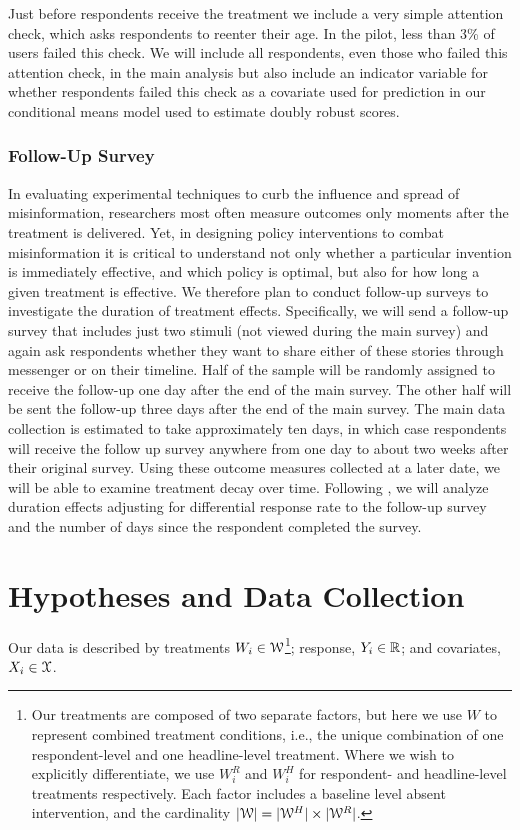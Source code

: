 \documentclass[letterpaper, 12pt, parskip=full,DIV=10]{scrartcl}
\begin{document}
{Just before respondents receive the treatment we include a very simple attention check, which asks respondents to reenter their age. In the pilot, less than 3\% of users failed this check. We will include all respondents, even those who failed this attention check, in the main analysis but also include an indicator variable for whether respondents failed this check as a covariate used for prediction in our conditional means model used to estimate doubly robust scores.} %

\subsubsection{Follow-Up Survey}

In evaluating experimental techniques to curb the influence and spread of misinformation, researchers most often measure outcomes only moments after the treatment is delivered. Yet, in designing policy interventions to combat misinformation it is critical to understand not only whether a particular invention is immediately effective, and which policy is optimal, but also for how long a given treatment is effective. We therefore plan to conduct follow-up surveys to investigate the duration of treatment effects. Specifically, we will send a follow-up survey that includes just two stimuli (not viewed during the main survey) and again ask respondents whether they want to share either of these stories through messenger or on their timeline. Half of the sample will be randomly assigned to receive the follow-up one day after the end of the main survey. The other half will be sent the follow-up three days after the end of the main survey. The main data collection is estimated to take approximately ten days, in which case respondents will receive the follow up survey anywhere from one day to about two weeks after their original survey. Using these outcome measures collected at a later date, we will be able to examine treatment decay over time. Following \citet{broockman2017design}, we will analyze duration effects adjusting for differential response rate to the follow-up survey and the number of days since the respondent completed the survey.  
 

\section{Hypotheses and Data Collection}

Our data is described by treatments $W_i \in {\EuScript W}$\footnote{Our treatments are composed of two separate factors, but here we use $W$ to represent combined treatment conditions, i.e., the unique combination of one respondent-level and one headline-level treatment. Where we wish to explicitly differentiate, we use $W^R_i$ and $W^H_i$ for respondent- and headline-level treatments respectively. Each factor includes a baseline level absent intervention, and the cardinality $|{\EuScript W}| = |{\EuScript W}^H|\times |{\EuScript W}^R|$.}; response,  $Y_i \in {\mathbb R}$; and covariates, $X_i \in {\EuScript X}$. 
\end{document}

